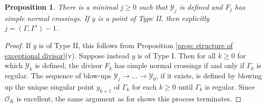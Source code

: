 \documentclass[12pt]{amsart}
\numberwithin{equation}{section}
\newtheorem{prop}[equation]{Proposition}
\theoremstyle{definition}
\renewcommand{\O}{\mathcal{O}}
\newcommand{\Y}{\mathcal{Y}}
\DeclareMathOperator{\mult}{mult}
\DeclareMathOperator{\ord}{ord}
\begin{document}

\begin{prop}\label{prop: local resolution desingularizes components}
There is a minimal $j\geq 0$ such that $\Y_j$ is defined and $F_j$ has simple normal crossings. If $y$ is a point of Type II, then explicitly $j=(\Gamma,\Gamma')-1$.
\end{prop}
\begin{proof}
    If $y$ is of Type II, this follows from Proposition \ref{prop: structure of exceptional divisor}(v). Suppose instead $y$ is of Type I. Then for all $k\geq 0$ for which $\Y_k$ is defined, the divisor $F_k$ has simple normal crossings if and only if $\Gamma_k$ is regular. The sequence of blow-ups $\Y_j\to...\to\Y_0$, if it exists, is defined by blowing up the unique singular point $y_{k+1}$ of $\Gamma_k$ for each $k\geq 0$ until $\Gamma_k$ is regular. Since $\O_K$ is excellent, the same argument as for \cite[Lemma 9.2.32]{Liu_book} shows this process terminates.
\end{proof}
\end{document}
